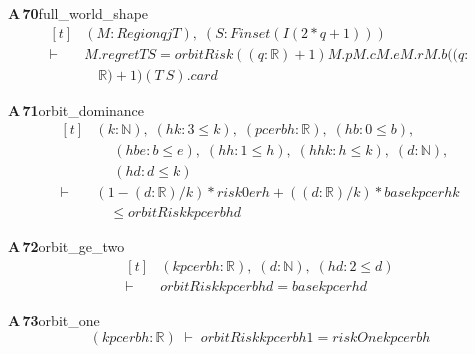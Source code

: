\documentclass[conference]{IEEEtran}
\theoremstyle{definition}
\newcommand{\lean}[1]{\textsf{\footnotesize #1}}
\begin{document}
\noindent\textbf{A\,70}\quad\lean{full\_world\_shape}
{\footnotesize\[ \begin{aligned}[t]
&(\mathit{M} : \mathit{Region} \mathit{q} \mathit{j} \mathit{T}),\; (\mathit{S} : \mathit{Finset} (\mathit{I} (2*\mathit{q}+1)))\\
\vdash\;&\mathit{M}.\mathit{regret} \mathit{T} \mathit{S}=\mathit{orbitRisk} ((\mathit{q}:\mathbb{R} )+1) \mathit{M}.\mathit{p} \mathit{M}.\mathit{c} \mathit{M}.\mathit{e} \mathit{M}.\mathit{r} \mathit{M}.\mathit{b} ((\mathit{q}:\\
&\quad \mathbb{R} )+1) (\mathit{T} \ \mathit{S}).\mathit{card}
\end{aligned} \]}

\noindent\textbf{A\,71}\quad\lean{orbit\_dominance}
{\footnotesize\[ \begin{aligned}[t]
&(\mathit{k} : \mathbb{N} ),\; (\mathit{hk} : 3 \leq \mathit{k}),\; (\mathit{p} \mathit{c} \mathit{e} \mathit{r} \mathit{b} \mathit{h} : \mathbb{R} ),\; (\mathit{hb} : 0 \leq \mathit{b}),\\
&\quad \; (\mathit{hbe} : \mathit{b} \leq \mathit{e}),\; (\mathit{hh} : 1 \leq \mathit{h}),\; (\mathit{hhk} : \mathit{h} \leq \mathit{k}),\; (\mathit{d} : \mathbb{N} ),\\
&\quad \; (\mathit{hd} : \mathit{d} \leq \mathit{k})\\
\vdash\;&(1-(\mathit{d}:\mathbb{R} )/\mathit{k})*\mathit{risk0} \mathit{e} \mathit{r} \mathit{h}+((\mathit{d}:\mathbb{R} )/\mathit{k})*\mathit{base} \mathit{k} \mathit{p} \mathit{c} \mathit{e} \mathit{r} \mathit{h} \mathit{k}\\
&\quad \leq \mathit{orbitRisk} \mathit{k} \mathit{p} \mathit{c} \mathit{e} \mathit{r} \mathit{b} \mathit{h} \mathit{d}
\end{aligned} \]}

\noindent\textbf{A\,72}\quad\lean{orbit\_ge\_two}
{\footnotesize\[ \begin{aligned}[t]
&(\mathit{k} \mathit{p} \mathit{c} \mathit{e} \mathit{r} \mathit{b} \mathit{h} : \mathbb{R} ),\; (\mathit{d} : \mathbb{N} ),\; (\mathit{hd} : 2 \leq \mathit{d})\\
\vdash\;&\mathit{orbitRisk} \mathit{k} \mathit{p} \mathit{c} \mathit{e} \mathit{r} \mathit{b} \mathit{h} \mathit{d}=\mathit{base} \mathit{k} \mathit{p} \mathit{c} \mathit{e} \mathit{r} \mathit{h} \mathit{d}
\end{aligned} \]}

\noindent\textbf{A\,73}\quad\lean{orbit\_one}
{\footnotesize\[ (\mathit{k} \mathit{p} \mathit{c} \mathit{e} \mathit{r} \mathit{b} \mathit{h} : \mathbb{R} ) \;\vdash\; \mathit{orbitRisk} \mathit{k} \mathit{p} \mathit{c} \mathit{e} \mathit{r} \mathit{b} \mathit{h} 1=\mathit{riskOne} \mathit{k} \mathit{p} \mathit{c} \mathit{e} \mathit{r} \mathit{b} \mathit{h} \]}
\end{document}
